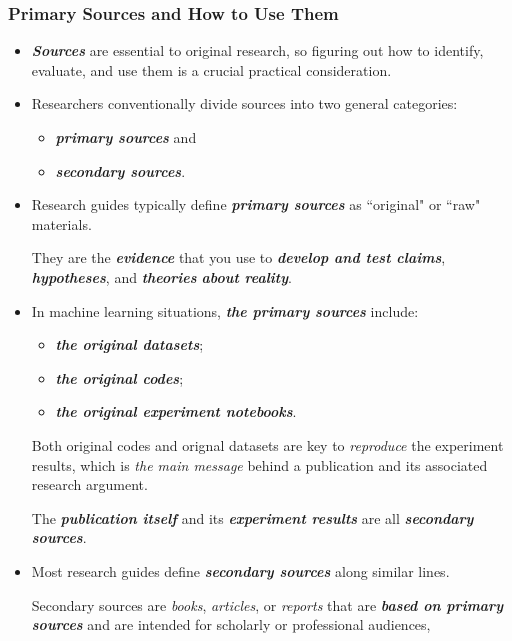 \documentclass[11pt]{article}
\begin{document}
\subsubsection{Primary Sources and How to Use Them}
\begin{itemize}
\item \emph{\textbf{Sources}} are essential to original research, so figuring out how to identify, evaluate, and use them is a crucial practical consideration. 

\item Researchers conventionally divide sources into two general categories:
\begin{itemize}
\item \emph{\textbf{primary sources}} and 
\item \emph{\textbf{secondary sources}}.
\end{itemize}

\item Research guides typically define \emph{\textbf{primary sources}} as ``original" or ``raw" materials. 

They are the \emph{\textbf{evidence}} that you use to \emph{\textbf{develop and test claims}}, \emph{\textbf{hypotheses}}, and \emph{\textbf{theories} \textbf{about reality}}. 

\item In machine learning situations, \emph{\textbf{the primary sources}} include:
\begin{itemize}
\item \emph{\textbf{the original datasets}};
\item \emph{\textbf{the original codes}};
\item \emph{\textbf{the original experiment notebooks}}.
\end{itemize} Both original codes and orignal datasets are key to \emph{reproduce} the experiment results, which is \emph{the main message} behind a publication and its associated research argument.

The \emph{\textbf{publication itself}} and its \emph{\textbf{experiment results}} are all \emph{\textbf{secondary sources}}.


\item  Most research guides define \emph{\textbf{secondary sources}} along similar lines. 

Secondary sources are \emph{books}, \emph{articles}, or \emph{reports} that are \emph{\textbf{based on primary sources}} and are intended for scholarly or professional audiences,


\end{itemize}
\end{document}
